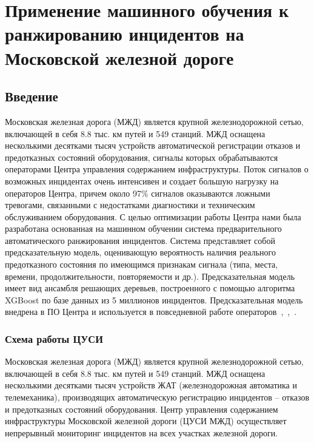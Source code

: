 \DeclareRobustCommand{\nomenclature}[2]{%
}

\DeclareRobustCommand{\cyrins}[1]{%
 #1
}

\chapter{Применение машинного обучения к ранжированию инцидентов на Московской железной дороге} \label{chapt2}

\section{Введение}
Московская железная дорога (МЖД) \nomenclature{МЖД}{Московская железная дорога} является крупной железнодорожной сетью, включающей в себя 8.8 тыс. км путей и 549 станций. МЖД оснащена несколькими десятками тысяч устройств автоматической регистрации отказов и предотказных состояний оборудования, сигналы которых обрабатываются операторами Центра управления содержанием инфраструктуры. Поток сигналов о возможных инцидентах очень интенсивен и создает большую нагрузку на операторов Центра, причем около 97\% сигналов оказываются ложными тревогами, связанными с недостатками диагностики и техническим обслуживанием оборудования. С целью оптимизации работы Центра нами была разработана основанная на машинном обучении система предварительного автоматического ранжирования инцидентов. Система представляет собой предсказательную модель, оценивающую вероятность наличия реального предотказного состояния по имеющимся признакам сигнала (типа, места, времени,  продолжительности, повторяемости и др.). Предсказательная модель имеет вид ансамбля решающих деревьев, построенного с помощью алгоритма XGBoost по базе данных из 5 миллионов инцидентов. Предсказательная модель внедрена в ПО Центра и используется в повседневной работе операторов~\cite{bulletin-rzd},~\cite{itivs-2017},~\cite{icmla-2017}.



\subsection{Схема работы ЦУСИ}
Московская железная дорога (МЖД) \nomenclature{МЖД}{Московская железная дорога} является крупной железнодорожной сетью, включающей в себя 8.8 тыс. км путей и 549 станций. МЖД оснащена несколькими десятками тысяч устройств ЖАТ (железнодорожная автоматика и телемеханика), производящих автоматическую регистрацию инцидентов -- отказов и предотказных состояний оборудования. Центр управления содержанием инфраструктуры \nomenclature{ЦУСИ}{Центр управления содержанием инфраструктуры} Московской железной дороги (ЦУСИ МЖД) осуществляет непрерывный мониторинг инцидентов на всех участках железной дороги. 
\nomenclature{ЖАТ}{Железнодорожная автоматика и телемеханика}

